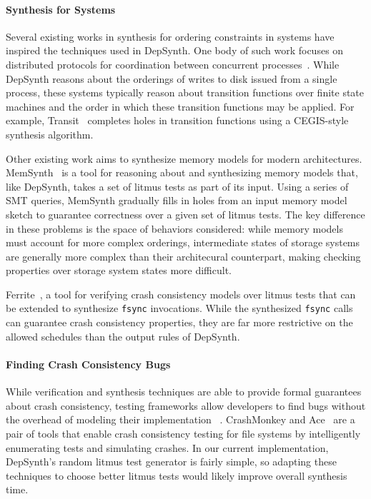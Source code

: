 \paragraph{Synthesis for Systems}
Several existing works in synthesis for ordering constraints in systems
have inspired the techniques used in DepSynth.
One body of such work focuses on distributed protocols for coordination
between concurrent processes~\cite{alur:synth-protocols}.
While DepSynth reasons about the orderings of
writes to disk issued from a single process, these systems typically reason about
transition functions over finite state machines and the order
in which these transition functions may be applied.
For example, Transit~\cite{udupa:transit} completes holes in transition functions
using a CEGIS-style synthesis algorithm.

Other existing work aims to synthesize memory models for modern architectures.
MemSynth~\cite{bornholt:memsynth} is a tool for reasoning about and synthesizing memory
models that, like DepSynth, takes a set of litmus tests as part of its input.
Using a series of SMT queries, MemSynth gradually fills in holes from an
input memory model sketch to guarantee correctness over a given set of
litmus tests.
The key difference in these problems is the space of behaviors considered:
while memory models must account for more complex orderings,
intermediate states of storage systems are generally more complex than their
architecural counterpart, making checking properties over storage system
states more difficult.

Ferrite~\cite{bornholt:ferrite}, a tool for verifying crash consistency models over litmus tests
that can be extended to synthesize \texttt{fsync} invocations.
While the synthesized \texttt{fsync} calls can guarantee crash consistency properties,
they are far more restrictive on the allowed schedules than
the output rules of DepSynth.

\paragraph{Finding Crash Consistency Bugs}
While verification and synthesis techniques are able to provide
formal guarantees about crash consistency, testing frameworks
allow developers to find bugs without the overhead of modeling
their implementation ~\cite{sun:pfscheck,fu:witcher}.
CrashMonkey and Ace~\cite{mohan:crashmonkey} are a pair of tools that
enable crash consistency testing for file systems
by intelligently enumerating tests and simulating crashes.
In our current implementation, DepSynth's random litmus test generator 
is fairly simple, so adapting these techniques to choose better litmus
tests would likely improve overall synthesis time.

\fi

